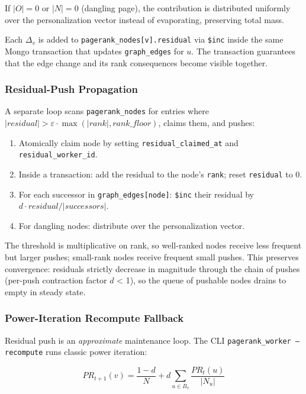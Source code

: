\documentclass[11pt,a4paper]{article}
\newcommand{\code}[1]{\texttt{#1}}
\begin{document}
If \(|O| = 0\) or \(|N| = 0\) (dangling page), the contribution is distributed uniformly over the personalization vector instead of evaporating, preserving total mass.

Each $\Delta_v$ is added to \code{pagerank\_nodes[v].residual} via \code{\$inc} inside the same Mongo transaction that updates \code{graph\_edges} for $u$. The transaction guarantees that the edge change and its rank consequences become visible together.

\subsubsection{Residual-Push Propagation}

A separate loop scans \code{pagerank\_nodes} for entries where \(|residual| > \varepsilon \cdot \max(|rank|, \textit{rank\_floor})\), claims them, and pushes:

\begin{enumerate}
  \item Atomically claim node by setting \code{residual\_claimed\_at} and \code{residual\_worker\_id}.
  \item Inside a transaction: add the residual to the node's \code{rank}; reset \code{residual} to 0.
  \item For each successor in \code{graph\_edges[node]}: \code{\$inc} their residual by $d \cdot \textit{residual} / |\textit{successors}|$.
  \item For dangling nodes: distribute over the personalization vector.
\end{enumerate}

The threshold is multiplicative on rank, so well-ranked nodes receive less frequent but larger pushes; small-rank nodes receive frequent small pushes. This preserves convergence: residuals strictly decrease in magnitude through the chain of pushes (per-push contraction factor $d$ < 1), so the queue of pushable nodes drains to empty in steady state.

\subsubsection{Power-Iteration Recompute Fallback}

Residual push is an \emph{approximate} maintenance loop. The CLI \code{pagerank\_worker --recompute} runs classic power iteration:

\begin{equation}
PR_{t+1}(v) = \frac{1-d}{N} + d \sum_{u \in B_v} \frac{PR_t(u)}{|N_u|}
\end{equation}
\end{document}
